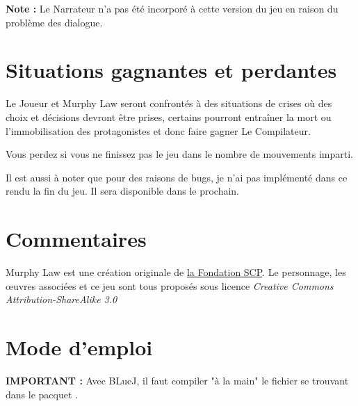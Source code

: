 \textbf{Note :} Le Narrateur n'a pas été incorporé à cette version du jeu en raison du problème des dialogue.

\section{Situations gagnantes et perdantes}

Le Joueur et Murphy Law seront confrontés à des situations de crises où des choix et décisions devront être prises, certains pourront entraîner la mort ou l'immobilisation des protagonistes et donc faire gagner Le Compilateur.

Vous perdez si vous ne finissez pas le jeu dans le nombre de mouvements imparti.

Il est aussi à noter que pour des raisons de bugs, je n'ai pas implémenté dans ce rendu la fin du jeu. Il sera disponible dans le prochain.

\section{Commentaires}

Murphy Law est une création originale de \href{http://scp-wiki.wikidot.com/murphy-law-hub}{la Fondation SCP}. Le personnage, les œuvres associées et ce jeu sont tous proposés sous licence \emph{Creative Commons Attribution-ShareAlike 3.0}

\section{Mode d'emploi}

\textbf{IMPORTANT :} Avec BLueJ, il faut compiler "à la main" le fichier  se trouvant dans le pacquet .
 
